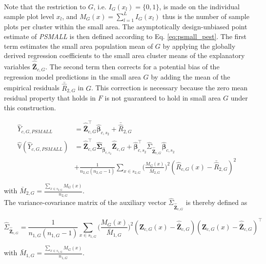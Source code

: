 \documentclass[remotesensing,article,submit,moreauthors,pdftex,10pt,a4paper]{mdpi}
\newcommand{\var}{\mathbb{V}}
\begin{document}
Note that the restriction to $G$, i.e. $I_{G}(x_l)=\{0,1\}$, is made on the individual sample plot level $x_l$, and $M_{G}(x) = \sum_{l=1}^{L}I_{G}(x_l)$ thus is the number of sample plots per cluster within the small area. The asymptotically design-unbiased point estimate of \textit{PSMALL} is then defined according to Eq. \ref{eq:psmall_pest}. The first term estimates the small area population mean of $G$ by applying the globally derived regression coefficients to the small area cluster means of the explanatory variables $\hat{\bar{\pmb{Z}}}_{c,G}$. The second term then corrects for a potential bias of the regression model predictions in the small area $G$ by adding the mean of the empirical residuals $\bar{\hat{R}}_{2,G}$ in $G$. This correction is necessary because the zero mean residual property that holds in $F$ is not guaranteed to hold in small area $G$ under this construction.

\begin{subequations}\label{eq:psmall}
	\begin{align}
	\hat{Y}_{c,G,PSMALL} &= \hat{\bar{\pmb{Z}}}_{c,G}^{\top}\hat{\pmb{\beta}}_{c,s_2} + \bar{\hat{R}}_{2,G} \label{eq:psmall_pest} \\
	\hat{\var}(\hat{Y}_{c,G,PSMALL}) & = \hat{\bar{\pmb{Z}}}_{c,G}^{\top}\hat{\pmb{\Sigma}}_{\hat{\pmb{\beta}}_{c,s_2}}\hat{\bar{\pmb{Z}}}_{c,G}
	+ \hat{\pmb{\beta}}_{c,s_2}^{\top}\hat{\Sigma}_{\hat{\bar{\pmb{Z}}}_{c,G}}\hat{\pmb{\beta}}_{c,s_2} \nonumber \\
	& + \frac{1}{n_{2,G}(n_{2,G}-1)}\sum_{x \in s_{2,G}}\Big(\frac{M_{G}(x)}{\bar{M}_{2,G}}\Big)^2(\hat{R}_{c,G}(x) - \bar{\hat{R}}_{2,G})^2
	\label{eq:psmallvar}
	\end{align}
\end{subequations}

\noindent with $\bar{M}_{2,G}=\frac{\sum_{x \in s_{2,G}}M_{G}(x)}{n_{2,G}}$.\\

The variance-covariance matrix of the auxiliary vector $\hat{\Sigma}_{\hat{\bar{\pmb{Z}}}_{c,G}}$ is thereby defined as

\begin{equation}\label{estvarcovaux_G}
\hat{\Sigma}_{\hat{\bar{\pmb{Z}}}_{c,G}} = \frac{1}{n_{1,G}(n_{1,G}-1)} \sum_{x \in s_{1,G}} \big(\frac{M_{G}(x)}{\bar{M}_{1,G}}\big)^2 (\pmb{Z}_{c,G}(x)-\hat{\bar{\pmb{Z}}}_{c,G})(\pmb{Z}_{c,G}(x)-\hat{\bar{\pmb{Z}}}_{c,G})^{\top}
\end{equation}

\noindent with $\bar{M}_{1,G}=\frac{\sum_{x \in s_{1,G}}M_{G}(x)}{n_{1,G}}$.\\
\end{document}
